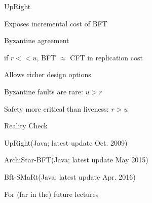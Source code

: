 \begin{frame}{UpRight}
\BIL
\item Exposes incremental cost of BFT
	\BI
	\item Byzantine agreement
	\item if $r << u$, BFT $\approx$ CFT in replication cost
	\EI
\item Allows richer design options
\BI
\item Byzantine faults are rare: $u > r$ 
\item Safety more critical than liveness: $r > u$
\EI
\EIL
\end{frame}

\begin{frame}{Reality Check}
\BI
\item UpRight\footnotemark (Java; latest update Oct. 2009)
\item ArchiStar-BFT\footnotemark (Java; latest update May 2015)
\item Bft-SMaRt\footnotemark (Java; latest update Apr. 2016)
\EI
{}
\end{frame}

\begin{frame}{For (far in the) future lectures}
\BI
\item {}
\EI
\end{frame}


\begin{RMFrame}

\BI
\item {}
\item {}
\EI

\end{RMFrame}

